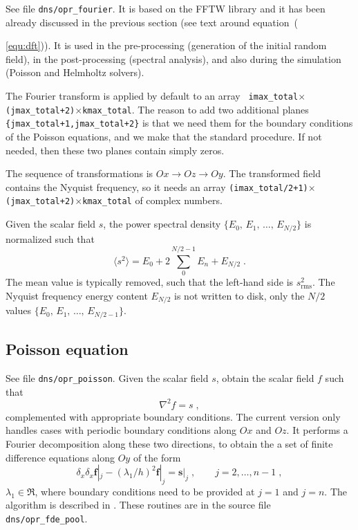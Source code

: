 See file {\tt dns/opr\_fourier}. It is based on the FFTW library and it has been
already discussed in the previous section (see text around
equation~({\ref{equ:dft})).  It is used in the pre-processing (generation of the
  initial random field), in the post-processing (spectral analysis), and also
  during the simulation (Poisson and Helmholtz solvers).

The Fourier transform is applied by default to an array {\tt
  imax\_total}$\times${\tt(jmax\_total+2)}$\times${\tt kmax\_total}. The reason
to add two additional planes {\tt \{jmax\_total+1,jmax\_total+2\}} is that we
need them for the boundary conditions of the Poisson equations, and we make that
the standard procedure. If not needed, then these two planes contain simply
zeros.

The sequence of transformations is $Ox\rightarrow Oz\rightarrow Oy$. The
transformed field contains the Nyquist frequency, so it needs an array
{\tt(imax\_total/2+1)}$\times${\tt(jmax\_total+2)}$\times${\tt kmax\_total} of
complex numbers.

Given the scalar field $s$, the power spectral density
$\{E_0,\,E_1,\,\ldots,\,E_{N/2}\}$ is normalized such that
\begin{equation}
\langle s^2\rangle = E_0+2\sum_0^{N/2-1}E_n+E_{N/2} \;.
\end{equation}
The mean value is typically removed, such that the left-hand side is
$s^2_\text{rms}$. The Nyquist frequency energy content $E_{N/2}$ is not written
to disk, only the $N/2$ values $\{E_0,\,E_1,\,\ldots,\,E_{N/2-1}\}$.

\subsection{Poisson equation}

See file {\tt dns/opr\_poisson}. Given the scalar field $s$, obtain the scalar
field $f$ such that
\begin{equation}
\nabla^2 f= s \;,
\end{equation}
complemented with appropriate boundary conditions.  The current version only
handles cases with periodic boundary conditions along $Ox$ and $Oz$. It performs
a Fourier decomposition along these two directions, to obtain the a set of
finite difference equations along $Oy$ of the form
\begin{equation}
  \delta_x \delta_x \mathbf{f}|_j - (\lambda_1/h)^2\mathbf{f}|_j=\mathbf{s}|_j 
  \;,\qquad j=2,\ldots,n-1 \;,
\end{equation}
$\lambda_1\in\Re$, where boundary conditions need to be provided at $j=1$ and
$j=n$.  The algorithm is described in \cite{Mellado:2012}. These routines are in
the source file {\tt dns/opr\_fde\_pool}.

}
